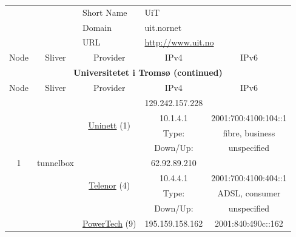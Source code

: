\begin{small}
\begin{center}
\begin{longtable}{|c|c|c|c|c|c|c|c|}
 \multicolumn{4}{|c|}{} & \multicolumn{1}{|l|}{Short Name} & \multicolumn{3}{|l|}{\nomenclature{UiT}{Universitetet i Tromsø}\index{UiT|see{Universitetet i Tromsø}}UiT} \\* \cline{5-5}\cline{6-6}\cline{7-7}\cline{8-8}
 \multicolumn{4}{|c|}{} & \multicolumn{1}{|l|}{Domain} & \multicolumn{3}{|l|}{\index{uit.nornet}uit.nornet} \\* \cline{5-5}\cline{6-6}\cline{7-7}\cline{8-8}
 \multicolumn{4}{|c|}{} & \multicolumn{1}{|l|}{URL} & \multicolumn{3}{|l|}{\url{http://www.uit.no}} \\ \hline
 \multicolumn{2}{|p{8em}|}{Node} & \multicolumn{2}{|p{8em}|}{Sliver} & \multicolumn{2}{|p{8em}|}{Provider} & IPv4 & IPv6 \\ \hline
\endfirsthead
\hline
 \multicolumn{8}{|c|}{\textbf{Universitetet i Tromsø (continued)}} \\ \hline
 \multicolumn{2}{|p{8em}|}{Node} & \multicolumn{2}{|p{8em}|}{Sliver} & \multicolumn{2}{|p{8em}|}{Provider} & IPv4 & IPv6 \\ \hline
\endhead
 \multirow{12}{*}{\tiny{1}} & \multicolumn{3}{|c|}{\multirow{12}{*}{\tiny{tunnelbox}}} & \multicolumn{2}{|c|}{\multirow{4}{*}{\tiny{\href{https://www.uninett.no}{Uninett} (1)}}} & \tiny{129.242.157.228} & \frownie{} \\* \cline{7-7}\cline{8-8}
  & \multicolumn{3}{|c|}{} & \multicolumn{2}{|c|}{} & \tiny{10.1.4.1} & \tiny{2001:700:4100:104::1} \\* \cline{7-7}\cline{8-8}
  & \multicolumn{3}{|c|}{} & \multicolumn{2}{|c|}{} & Type: & fibre, business \\* \cline{7-7}\cline{8-8}
  & \multicolumn{3}{|c|}{} & \multicolumn{2}{|c|}{} & Down/Up:  & unspecified \\* \cline{5-5}\cline{6-6}\cline{7-7}\cline{8-8}
  & \multicolumn{3}{|c|}{} & \multicolumn{2}{|c|}{\multirow{4}{*}{\tiny{\href{https://www.telenor.no}{Telenor} (4)}}} & \tiny{62.92.89.210} & \frownie{} \\* \cline{7-7}\cline{8-8}
  & \multicolumn{3}{|c|}{} & \multicolumn{2}{|c|}{} & \tiny{10.4.4.1} & \tiny{2001:700:4100:404::1} \\* \cline{7-7}\cline{8-8}
  & \multicolumn{3}{|c|}{} & \multicolumn{2}{|c|}{} & Type: & ADSL, consumer \\* \cline{7-7}\cline{8-8}
  & \multicolumn{3}{|c|}{} & \multicolumn{2}{|c|}{} & Down/Up:  & unspecified \\* \cline{5-5}\cline{6-6}\cline{7-7}\cline{8-8}
  & \multicolumn{3}{|c|}{} & \multicolumn{2}{|c|}{\multirow{4}{*}{\tiny{\href{http://www.powertech.no}{PowerTech} (9)}}} & \tiny{195.159.158.162} & \tiny{2001:840:490c::162} \\* \cline{7-7}\cline{8-8}

\end{longtable}
\end{center}
\end{small}
